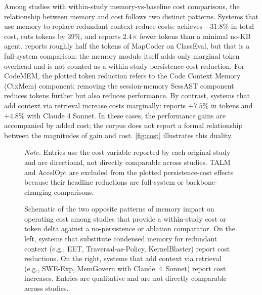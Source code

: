 Among studies with within-study memory-vs-baseline cost comparisons,
the relationship between memory and cost follows two distinct patterns.
Systems that use memory to replace redundant context reduce costs:
\citet{guo2026eet} achieves $-31.8$\% in total cost,
\citet{li2026traversalaspolicy} cuts tokens by 39\%, and
\citet{dong2026kernelblaster} reports 2.4$\times$ fewer tokens than a
minimal no-KB agent.
\citet{shen2025talm} reports roughly half the tokens of MapCoder on
ClassEval, but that is a full-system comparison;
the memory module itself adds only marginal token overhead and is not
counted as a within-study persistence-cost reduction.
For CodeMEM, the plotted token reduction refers to the Code Context
Memory (CtxMem) component;
removing the session-memory SessAST component reduces tokens further
but also reduces performance.
By contrast, systems that add context via retrieval increase costs
marginally:
\citet{chen2025sweexp} reports $+7.5$\% in tokens and
\citet{wang2026memgovern} $+4.8$\% with Claude 4 Sonnet.
In these cases, the performance gains are accompanied by added cost;
the corpus does not report a formal relationship between the
magnitudes of gain and cost.
\autoref{fig:cost} illustrates this duality.

\begin{figure}[!htbp]
  \centering
  \resizebox{\textwidth}{!}{}
  \caption{Schematic of the two opposite patterns of memory impact on
    operating cost among studies that provide a within-study cost or
    token delta against a no-persistence or ablation comparator.
    On the left, systems that substitute condensed memory for
    redundant context (e.g., EET, Traversal-as-Policy, KernelBlaster)
    report cost reductions.
    On the right, systems that add context via retrieval (e.g.,
    SWE-Exp, MemGovern with Claude~4~Sonnet) report cost increases.
    Entries are qualitative and are not directly comparable across
    studies.}
  \label{fig:cost}
  \par\smallskip
  \footnotesize\emph{Note.}
  Entries use the cost variable reported by each original study and are
  directional, not directly comparable across studies.
  TALM and AccelOpt are excluded from the plotted persistence-cost
  effects because their headline reductions are full-system or
  backbone-changing comparisons.
  \normalsize
\end{figure}

